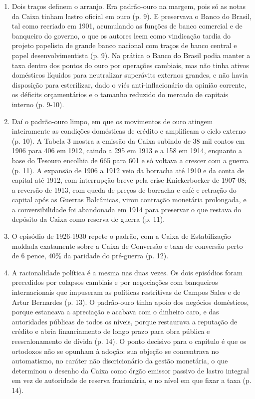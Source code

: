 \begin{enumerate}[leftmargin=*,nosep]
\item Dois traços definem o arranjo. Era padrão-ouro na margem, pois só as notas da Caixa tinham lastro oficial em ouro (p. 9). E preservava o Banco do Brasil, tal como recriado em 1901, acumulando as funções de banco comercial e de banqueiro do governo, o que os autores leem como vindicação tardia do projeto papelista de grande banco nacional com traços de banco central e papel desenvolvimentista (p. 9). Na prática o Banco do Brasil podia manter a taxa dentro dos pontos do ouro por operações cambiais, mas não tinha ativos domésticos líquidos para neutralizar superávits externos grandes, e não havia disposição para esterilizar, dado o viés anti-inflacionário da opinião corrente, os déficits orçamentários e o tamanho reduzido do mercado de capitais interno (p. 9-10).

\item Daí o padrão-ouro limpo, em que os movimentos de ouro atingem inteiramente as condições domésticas de crédito e amplificam o ciclo externo (p. 10). A Tabela 3 mostra a emissão da Caixa subindo de 38 mil contos em 1906 para 406 em 1912, caindo a 295 em 1913 e a 158 em 1914, enquanto a base do Tesouro encolhia de 665 para 601 e só voltava a crescer com a guerra (p. 11). A expansão de 1906 a 1912 veio da borracha até 1910 e da conta de capital até 1912, com interrupção breve pela crise Knickerbocker de 1907-08; a reversão de 1913, com queda de preços de borracha e café e retração do capital após as Guerras Balcânicas, virou contração monetária prolongada, e a conversibilidade foi abandonada em 1914 para preservar o que restava do depósito da Caixa como reserva de guerra (p. 11).

\item O episódio de 1926-1930 repete o padrão, com a Caixa de Estabilização moldada exatamente sobre a Caixa de Conversão e taxa de conversão perto de 6 pence, 40\% da paridade do pré-guerra (p. 12).

\item A racionalidade política é a mesma nas duas vezes. Os dois episódios foram precedidos por colapsos cambiais e por negociações com banqueiros internacionais que impuseram as políticas restritivas de Campos Sales e de Artur Bernardes (p. 13). O padrão-ouro tinha apoio dos negócios domésticos, porque estancava a apreciação e acabava com o dinheiro caro, e das autoridades públicas de todos os níveis, porque restaurava a reputação de crédito e abria financiamento de longo prazo para obra pública e reescalonamento de dívida (p. 14). O ponto decisivo para o capítulo é que os ortodoxos não se opunham à adoção: sua objeção se concentrava no automatismo, no caráter não discricionário da gestão monetária, o que determinou o desenho da Caixa como órgão emissor passivo de lastro integral em vez de autoridade de reserva fracionária, e no nível em que fixar a taxa (p. 14).


\end{enumerate}
